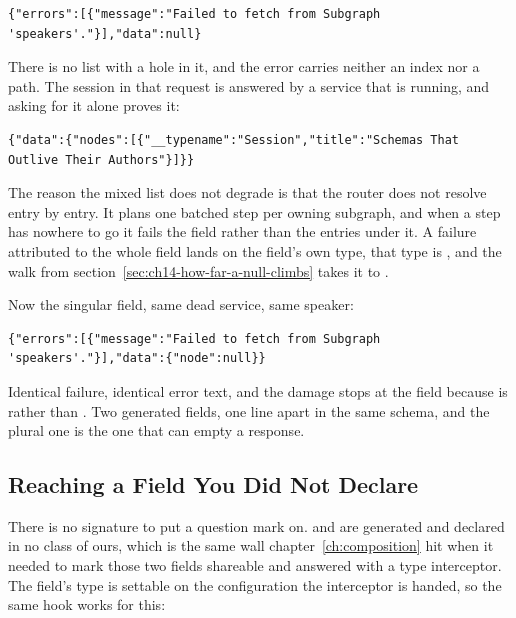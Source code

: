\begin{verbatim}
{"errors":[{"message":"Failed to fetch from Subgraph 'speakers'."}],"data":null}
\end{verbatim}

%
There is no list with a hole in it, and the error carries neither an index nor
a path. The session in that request is answered by a service that is running,
and asking for it alone proves it:

\begin{verbatim}
{"data":{"nodes":[{"__typename":"Session","title":"Schemas That Outlive Their Authors"}]}}
\end{verbatim}

%
The reason the mixed list does not degrade is that the router does not resolve
 entry by entry. It plans one batched step per owning subgraph, and
when a step has nowhere to go it fails the field rather than the entries under
it. A failure attributed to the whole field lands on the field's own type, that
type is \code{[Node]!}, and the walk from
section~\ref{sec:ch14-how-far-a-null-climbs} takes it to .

%
Now the singular field, same dead service, same speaker:

\begin{verbatim}
{"errors":[{"message":"Failed to fetch from Subgraph 'speakers'."}],"data":{"node":null}}
\end{verbatim}

%
Identical failure, identical error text, and the damage stops at the field
because  is  rather than . Two generated
fields, one line apart in the same schema, and the plural one is the one that
can empty a response.

\subsection{Reaching a Field You Did Not Declare}

%
There is no signature to put a question mark on.  and 
are generated and declared in no class of ours, which is the same wall
chapter~\ref{ch:composition} hit when it needed to mark those two fields
shareable and answered with a type interceptor. The field's type is settable on
the configuration the interceptor is handed, so the same hook works for this:

